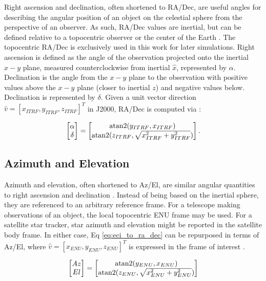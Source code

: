 Right ascension and declination, often shortened to RA/Dec, are useful angles for describing the angular position of an object on the celestial sphere from the perspective of an observer. As such, RA/Dec values are inertial, but can be defined relative to a topocentric observer or the center of the Earth \cite{frueh2019notes}. The topocentric RA/Dec is exclusively used in this work for later simulations. Right ascension is defined as the angle
of the observation projected onto the inertial $x-y$ plane, measured counterclockwise from inertial
$\hat{x}$, represented by $\alpha$. Declination is the angle from the $x-y$ plane to the observation
with positive values above the $x-y$ plane (closer to inertial $z$) and negative values below.
Declination is represented by $\delta$. Given a unit vector direction $\hat{v} = \left[ x_{ITRF}, y_{ITRF}, z_{ITRF} \right]^T$ in J2000, RA/Dec is computed via \cite{frueh2019notes}:

\begin{equation} \label{eq:eci_to_ra_dec}
  \begin{bmatrix}
	\alpha \\
	\delta
  \end{bmatrix} = 
  \begin{bmatrix}
	\operatorname{atan2}(y_{ITRF}, x_{ITRF}) \\
	\operatorname{atan2}(z_{ITRF}, \sqrt{x_{ITRF}^2 + y_{ITRF}^2})
  \end{bmatrix}.
\end{equation}

\subsection{Azimuth and Elevation}

Azimuth and elevation, often shortened to Az/El, are similar angular quantities to right ascension and declination \cite{frueh2019notes}. Instead of being based on
the inertial sphere, they are referenced to an arbitrary reference frame. For a telescope making
observations of an object, the local topocentric ENU frame may be used. For a satellite star
tracker, star azimuth and elevation might be reported in the satellite body frame. In either case,
Eq \ref{eq:eci_to_ra_dec} can be repurposed in terms of Az/El, where $\hat{v} = \left[ x_{ENU}, y_{ENU}, z_{ENU}
\right]^T$ is expressed in the frame of interest \cite{frueh2019notes}.

\begin{equation} \label{eq:enu_to_az_el}
  \begin{bmatrix}
	Az \\
	El
  \end{bmatrix} = 
  \begin{bmatrix}
	\operatorname{atan2}(y_{ENU}, x_{ENU}) \\
	\operatorname{atan2}(z_{ENU}, \sqrt{x_{ENU}^2 + y_{ENU}^2})
  \end{bmatrix}
\end{equation}

